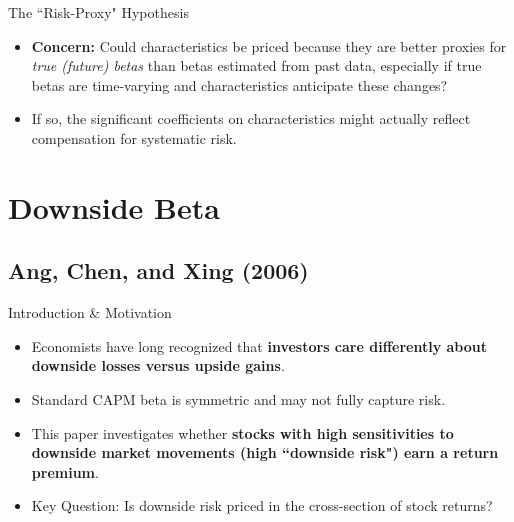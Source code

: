\documentclass[10pt]{beamer}
\begin{document}
\begin{frame}{The ``Risk-Proxy" Hypothesis}
  \begin{itemize}
    \item \textbf{Concern:} Could characteristics be priced because they are better proxies for \textit{true (future) betas} than betas estimated from past data, especially if true betas are time-varying and characteristics anticipate these changes?
    \item If so, the significant coefficients on characteristics might actually reflect compensation for systematic risk.
  \end{itemize}
\end{frame}

\section{Downside Beta}

\subsection{Ang, Chen, and Xing (2006)}

\begin{frame}{Introduction \& Motivation}
    \begin{itemize}
        \item Economists have long recognized that \textbf{investors care differently about downside losses versus upside gains}.
        \item Standard CAPM beta is symmetric and may not fully capture risk.
        \item This paper investigates whether \textbf{stocks with high sensitivities to downside market movements (high ``downside risk") earn a return premium}.
        \item Key Question: Is downside risk priced in the cross-section of stock returns?
    \end{itemize}
\end{frame}
\end{document}

